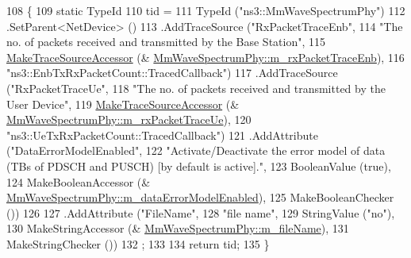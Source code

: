 \begin{DoxyCode}
108 \{
109         \textcolor{keyword}{static} TypeId
110                 tid =
111             TypeId (\textcolor{stringliteral}{"ns3::MmWaveSpectrumPhy"})
112             .SetParent<NetDevice> ()
113                 .AddTraceSource (\textcolor{stringliteral}{"RxPacketTraceEnb"},
114                                                  \textcolor{stringliteral}{"The no. of packets received and transmitted by the Base
       Station"},
115                                                  \hyperlink{group__tracing_gab21a770b9855af4e8f69f7531ea4a6b0}{MakeTraceSourceAccessor} (&
      \hyperlink{classns3_1_1MmWaveSpectrumPhy_ab0161a801e531b9d95230f4d464640a3}{MmWaveSpectrumPhy::m\_rxPacketTraceEnb}),
116                                                  \textcolor{stringliteral}{"ns3::EnbTxRxPacketCount::TracedCallback"})
117                 .AddTraceSource (\textcolor{stringliteral}{"RxPacketTraceUe"},
118                                                  \textcolor{stringliteral}{"The no. of packets received and transmitted by the User
       Device"},
119                                                  \hyperlink{group__tracing_gab21a770b9855af4e8f69f7531ea4a6b0}{MakeTraceSourceAccessor} (&
      \hyperlink{classns3_1_1MmWaveSpectrumPhy_a9a0b7373bd200aebda3532c70e74e81d}{MmWaveSpectrumPhy::m\_rxPacketTraceUe}),
120                                                  \textcolor{stringliteral}{"ns3::UeTxRxPacketCount::TracedCallback"})
121                 .AddAttribute (\textcolor{stringliteral}{"DataErrorModelEnabled"},
122                                                                                 \textcolor{stringliteral}{"Activate/Deactivate the
       error model of data (TBs of PDSCH and PUSCH) [by default is active]."},
123                                                  BooleanValue (\textcolor{keyword}{true}),
124                                                  MakeBooleanAccessor (&
      \hyperlink{classns3_1_1MmWaveSpectrumPhy_a7a5d1549e8a4692b15a504f41716206c}{MmWaveSpectrumPhy::m\_dataErrorModelEnabled}),
125                                                  MakeBooleanChecker ())
126 
127                 .AddAttribute (\textcolor{stringliteral}{"FileName"},
128                                                 \textcolor{stringliteral}{"file name"},
129                                                  StringValue (\textcolor{stringliteral}{"no"}),
130                                                  MakeStringAccessor (&
      \hyperlink{classns3_1_1MmWaveSpectrumPhy_a110a83ea3c1e05677e0ce5e5b333b0f5}{MmWaveSpectrumPhy::m\_fileName}),
131                                                  MakeStringChecker ())
132                 ;
133 
134         \textcolor{keywordflow}{return} tid;
135 \}
\end{DoxyCode}


